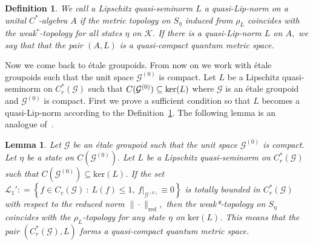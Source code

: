 \documentclass[a4paper,11pt,reqno]{amsart}
\theoremstyle{plain}
\newtheorem{lem}[thm]{Lemma}
\newtheorem{defn}[thm]{Definition}
\theoremstyle{named}
\numberwithin{equation}{section}
\begin{document}
			\begin{defn}\label{def10}
				We call a Lipschitz quasi-seminorm $L$ a quasi-Lip-norm on a unital $C^{\ast}$-algebra $A$ if the metric topology on $S_{\eta}$ induced from $\rho_L$ coincides with the weak$^{\ast}$-topology for all states $\eta$ on $\mathcal K.$ If there is a quasi-Lip-norm $L$ on $A,$ we say that that the pair $(A, L)$ is a quasi-compact quantum metric space. 
			\end{defn}
			Now we come back to étale groupoids. From now on we work with étale groupoids such that the unit space $\mathcal G^{(0)}$ is compact. Let $L$ be a Lipschitz quasi-seminorm on $C^{\ast}_{r}(\mathcal G)$ such that $C(\mathcal G^{(0)})\subseteq {\rm ker}(L)$ where $\mathcal G$ is an étale groupoid and $\mathcal G^{(0)}$ is compact. First we prove a sufficient condition so that $L$ becomes a quasi-Lip-norm according to the Definition~\ref{def10}. The following lemma is an analogue of~\cite[Theorem 1.8]{Rieffel-1998-Metrics-on-state-from-action-of-cmpt-gp}.
			\begin{lem}\label{lem20}
				Let $\mathcal G$ be an étale groupoid such that the unit space $\mathcal G^{(0)}$ is compact. Let $\eta$ be a state on $C(\mathcal G^{(0)}).$ Let $L$ be a Lipschitz quasi-seminorm on $C_r^{\ast} (\mathcal G)$ such that $C(\mathcal G^{(0)})\subseteq {\mathrm {ker}}(L)$. If the set $\mathcal L_1' : = \left \{f \in C_c (\mathcal G)\ :\ L(f) \leq 1,\ f\rvert_{\mathcal G^{(0)}} \equiv 0 \right \}$ is totally bounded in $C_r^{\ast} (\mathcal G)$ with respect to the reduced norm $\|\cdot\|_{\mathrm {red}},$ then the weak*-topology on $S_{\eta}$ coincides with the $\rho_{L}$-topology for any state $\eta$ on $\mathrm {ker} (L)$. This means that the pair \((C_r^{\ast}(\mathcal{G}), L)\) forms a quasi-compact quantum metric space.    
			\end{lem}
			
\end{document}
